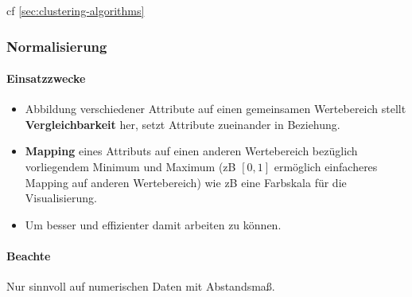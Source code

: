\documentclass[10pt]{article} %
\begin{document}
\begin{definition}[Clustering] 
       cf \ref{sec:clustering-algorithms}
\end{definition} 






\subsubsection{Normalisierung}
\label{sec:normalisation}

\paragraph{Einsatzzwecke} 
\begin{itemize}
    \item Abbildung verschiedener Attribute auf einen gemeinsamen Wertebereich
      stellt \textbf{Vergleichbarkeit} her, setzt Attribute zueinander in Beziehung. 
    \item \textbf{Mapping} eines Attributs auf einen anderen Wertebereich bezüglich vorliegendem Minimum und Maximum (zB $[0,1]$ ermöglich einfacheres Mapping auf anderen Wertebereich) wie zB eine Farbskala für die Visualisierung.
    \item Um besser und effizienter damit arbeiten zu können. 
\end{itemize}

\paragraph{Beachte} Nur sinnvoll auf numerischen Daten mit Abstandsmaß. 
\end{document}
